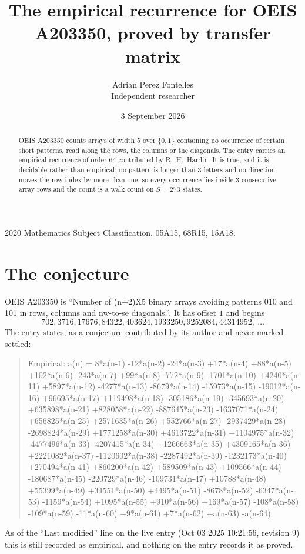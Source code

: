 \documentclass[11pt,a4paper]{article}
\title{The empirical recurrence for OEIS A203350, proved by transfer matrix}
\author{Adrian Perez Fontelles\\ \small Independent researcher}
\date{3 September 2026}
\theoremstyle{plain}
\theoremstyle{definition}
\begin{document}
\maketitle

\begin{abstract}
OEIS A203350 counts arrays of width $5$ over $\{0,1\}$ containing no occurrence of certain short
patterns, read along the rows, the columns or the diagonals. The entry carries an empirical
recurrence of order $64$ contributed by R.~H.~Hardin. It is true, and it is decidable
rather than empirical: no pattern is longer than $3$ letters and no direction moves the row
index by more than one, so every occurrence lies inside $3$ consecutive array rows and the
count is a walk count on $S=273$ states.
\end{abstract}

\noindent\small 2020 Mathematics Subject Classification. 05A15, 68R15, 15A18.\normalsize

\section{The conjecture}

OEIS A203350 is ``Number of (n+2)X5 binary arrays avoiding patterns 010 and 101 in rows, columns and nw-to-se diagonals.''. It has offset $1$ and begins
\[
702, 3716, 17676, 84322, 403624, 1933250, 9252084, 44314952,\ \dots
\]
The entry states, as a conjecture contributed by its author and never marked settled:
\begin{quote}
Empirical: a(n) = 8*a(n-1) -12*a(n-2) -24*a(n-3) +17*a(n-4) +88*a(n-5) +102*a(n-6) -243*a(n-7) +99*a(n-8) -772*a(n-9) -1701*a(n-10) +4240*a(n-11) +5897*a(n-12) -4277*a(n-13) -8679*a(n-14) -15973*a(n-15) -19012*a(n-16) +96695*a(n-17) +119498*a(n-18) -305186*a(n-19) -345693*a(n-20) +635898*a(n-21) +828058*a(n-22) -887645*a(n-23) -1637071*a(n-24) +656825*a(n-25) +2571635*a(n-26) +552766*a(n-27) -2937429*a(n-28) -2698824*a(n-29) +1771258*a(n-30) +4613722*a(n-31) +1104975*a(n-32) -4477496*a(n-33) -4207415*a(n-34) +1266663*a(n-35) +4309165*a(n-36) +2221082*a(n-37) -1120602*a(n-38) -2287492*a(n-39) -1232173*a(n-40) +270494*a(n-41) +860200*a(n-42) +589509*a(n-43) +109566*a(n-44) -180687*a(n-45) -220729*a(n-46) -109731*a(n-47) +10788*a(n-48) +55399*a(n-49) +34551*a(n-50) +4495*a(n-51) -8678*a(n-52) -6347*a(n-53) -1159*a(n-54) +1095*a(n-55) +910*a(n-56) +169*a(n-57) -108*a(n-58) -109*a(n-59) -11*a(n-60) +9*a(n-61) +7*a(n-62) +a(n-63) -a(n-64)
\end{quote}
As of the ``Last modified'' line on the live entry (Oct 03 2025 10:21:56, revision 9) this is still
recorded as empirical, and nothing on the entry records it as proved.
\end{document}
